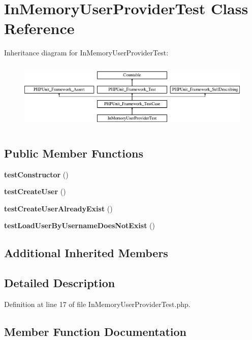 \section{In\+Memory\+User\+Provider\+Test Class Reference}
\label{class_symfony_1_1_component_1_1_security_1_1_core_1_1_tests_1_1_user_1_1_in_memory_user_provider_test}
Inheritance diagram for In\+Memory\+User\+Provider\+Test\+:\begin{figure}[H]
\begin{center}
\leavevmode
\includegraphics[height=3.303835cm]{class_symfony_1_1_component_1_1_security_1_1_core_1_1_tests_1_1_user_1_1_in_memory_user_provider_test}
\end{center}
\end{figure}
\subsection*{Public Member Functions}
\begin{DoxyCompactItemize}
\item 
{\bf test\+Constructor} ()
\item 
{\bf test\+Create\+User} ()
\item 
{\bf test\+Create\+User\+Already\+Exist} ()
\item 
{\bf test\+Load\+User\+By\+Username\+Does\+Not\+Exist} ()
\end{DoxyCompactItemize}
\subsection*{Additional Inherited Members}


\subsection{Detailed Description}


Definition at line 17 of file In\+Memory\+User\+Provider\+Test.\+php.



\subsection{Member Function Documentation}
